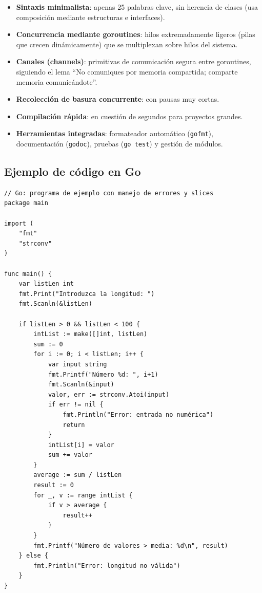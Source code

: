 \begin{itemize}
  \item \textbf{Sintaxis minimalista}: apenas 25 palabras clave, sin herencia de clases (usa composición mediante estructuras e interfaces).
  \item \textbf{Concurrencia mediante goroutines}: hilos extremadamente ligeros (pilas que crecen dinámicamente) que se multiplexan sobre hilos del sistema.
  \item \textbf{Canales (channels)}: primitivas de comunicación segura entre goroutines, siguiendo el lema ``No comuniques por memoria compartida; comparte memoria comunicándote''.
  \item \textbf{Recolección de basura concurrente}: con pausas muy cortas.
  \item \textbf{Compilación rápida}: en cuestión de segundos para proyectos grandes.
  \item \textbf{Herramientas integradas}: formateador automático (\texttt{gofmt}), documentación (\texttt{godoc}), pruebas (\texttt{go test}) y gestión de módulos.
\end{itemize}

\subsection{Ejemplo de código en Go}

\begin{verbatim}
// Go: programa de ejemplo con manejo de errores y slices
package main

import (
    "fmt"
    "strconv"
)

func main() {
    var listLen int
    fmt.Print("Introduzca la longitud: ")
    fmt.Scanln(&listLen)

    if listLen > 0 && listLen < 100 {
        intList := make([]int, listLen)
        sum := 0
        for i := 0; i < listLen; i++ {
            var input string
            fmt.Printf("Número %d: ", i+1)
            fmt.Scanln(&input)
            valor, err := strconv.Atoi(input)
            if err != nil {
                fmt.Println("Error: entrada no numérica")
                return
            }
            intList[i] = valor
            sum += valor
        }
        average := sum / listLen
        result := 0
        for _, v := range intList {
            if v > average {
                result++
            }
        }
        fmt.Printf("Número de valores > media: %d\n", result)
    } else {
        fmt.Println("Error: longitud no válida")
    }
}
\end{verbatim}

